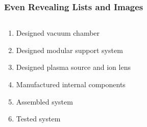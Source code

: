 \documentclass{beamer}
\begin{document}
        \begin{frame}
            \frametitle{Even Revealing Lists and Images}
            \begin{columns}[T]
                \begin{column}{0.5\textwidth}
                    \begin{enumerate}
                        \item<1-> Designed vacuum chamber
                        \item<2-> Designed modular support system
                        \item<3-> Designed plasma source and ion lens
                        \item<4-> Manufactured internal components
                        \item<5-> Assembled system
                        \item<6-> Tested system
                    \end{enumerate}
                \end{column}
                \begin{column}{0.5\textwidth}
                    \begin{figure}[htbp]
                        \begin{centering}
                            \begin{overlayarea}{\textwidth}{\textheight}
                            \end{overlayarea}
                        \end{centering}
                    \end{figure}
                \end{column}
            \end{columns}
        \end{frame}
\end{document}
